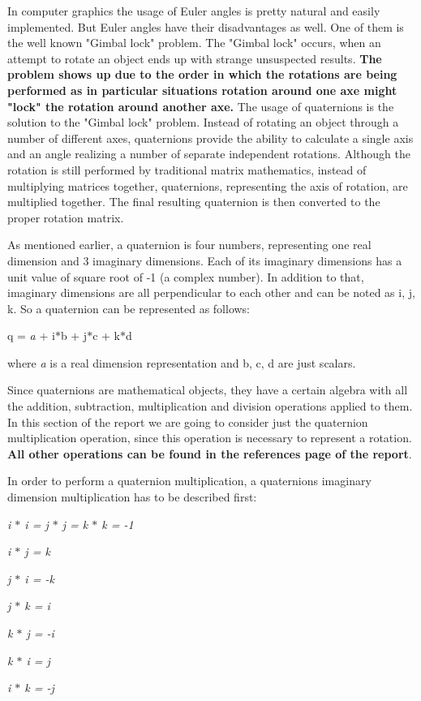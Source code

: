 \documentclass[times, 10pt,twocolumn]{article}
\begin{document}
In computer graphics the usage of Euler angles is pretty natural and easily implemented. But Euler angles have their disadvantages as well. One of them is the well known "Gimbal lock" problem.  The "Gimbal lock" occurs, when an attempt to rotate an object ends up with strange unsuspected results. \textbf{The problem shows up due to the order in which the rotations are being performed as in particular situations rotation around one axe might "lock" the rotation around another axe.} The usage of quaternions is the solution to the "Gimbal lock" problem. Instead of rotating an object through a number of different axes, quaternions provide the ability to calculate a single axis and an angle realizing a number of separate independent rotations. Although the rotation is still performed by traditional matrix mathematics, instead of multiplying matrices together, quaternions, representing the axis of rotation, are multiplied together. The final resulting quaternion is then converted to the proper rotation matrix.

As mentioned earlier, a quaternion is four numbers, representing one real dimension and 3 imaginary dimensions. Each of its imaginary dimensions has a unit value of square root of -1 (a complex number). In addition to that, imaginary dimensions are all perpendicular to each other and can be noted as i, j, k. So a quaternion can be represented as follows:
\begin{center}
q = \emph{a} + i$\ast$b + j$\ast$c + k$\ast$d
\end{center}
where \emph{a} is a real dimension representation and b,  c,  d are just scalars.

Since quaternions are mathematical objects, they have a certain algebra with all the addition, subtraction,  multiplication and division operations applied to them. In this section of the report we are going to consider just the quaternion multiplication operation, since this operation is necessary to represent a rotation. \textbf{All other operations can be found in the references page of the report}.

In order to perform a quaternion multiplication, a quaternions imaginary dimension multiplication has to be described first:

\begin{description}
    \setlength{\itemsep}{0pt}

    \item \emph{i $\ast$ i = j $\ast$ j = k $\ast$ k = -1}
    \item \emph{i $\ast$ j = k}
    \item \emph{j $\ast$ i = -k}
    \item \emph{j $\ast$ k = i}
    \item \emph{k $\ast$ j = -i}
    \item \emph{k $\ast$ i =  j}
    \item \emph{i $\ast$ k = -j}
\end{description}
\end{document}
